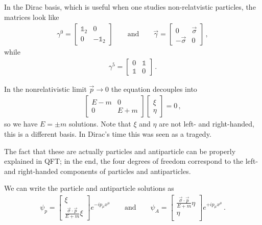 \documentclass[main.tex]{subfiles}
\begin{document}
In the Dirac basis, which is useful when one studies non-relatvistic particles, 
the matrices look like 
%
\begin{align}
\gamma^{0} = \left[\begin{array}{cc}
\mathbb{1}_2 & 0 \\ 
0 & -\mathbb{1}_2
\end{array}\right]
\qquad \text{and} \qquad
\vec{\gamma} = \left[\begin{array}{cc}
0 & \vec{\sigma} \\ 
- \vec{\sigma} & 0
\end{array}\right]
\,,
\end{align}
%
while 
%
\begin{align}
\gamma^{5} = \left[\begin{array}{cc}
0 & \mathbb{1} \\ 
\mathbb{1} & 0
\end{array}\right]
\,.
\end{align}

In the nonrelativistic limit \(\vec{p} \to 0\) the equation decouples into 
%
\begin{align}
\left[\begin{array}{cc}
E-m & 0 \\ 
0 & E+m
\end{array}\right]
\left[\begin{array}{c}
\xi  \\ 
\eta 
\end{array}\right] 
= 0 
\,,
\end{align}
%
so we have \(E = \pm m\) solutions. 
Note that \(\xi \) and \(\eta \) are not left- and right-handed, this is a different basis.
In Dirac's time this was seen as a tragedy. 

The fact that these are actually particles and antiparticle can be properly explained in QFT; 
in the end, the four degrees of freedom correspond to the left- and right-handed components of
particles and antiparticles. 

We can write the particle and antiparticle solutions as 
%
\begin{align}
\psi _p = \left[\begin{array}{c}
\xi  \\ 
\frac{\vec{\sigma} \cdot \vec{p}}{E+m} \xi 
\end{array}\right]
e^{-i p_\mu x^{\mu }}
\qquad \text{and} \qquad
\psi _A = \left[\begin{array}{c}
\frac{\vec{\sigma} \cdot \vec{p}}{E+m} \eta  \\
\eta   \\ 
\end{array}\right]
e^{+i p_\mu x^{\mu }}
\,.
\end{align}
\end{document}
